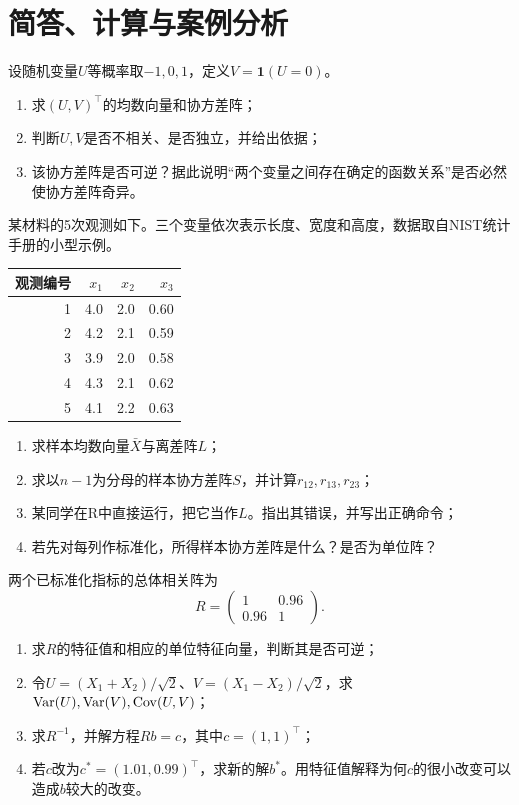 \section{简答、计算与案例分析}

设随机变量$U$等概率取$-1,0,1$，定义$V=\mathbf 1(U=0)$。
\begin{enumerate}[label=（\arabic*）]
\item 求$(U,V)^\top$的均数向量和协方差阵；
\item 判断$U,V$是否不相关、是否独立，并给出依据；
\item 该协方差阵是否可逆？据此说明“两个变量之间存在确定的函数关系”是否必然使协方差阵奇异。
\end{enumerate}

某材料的5次观测如下。三个变量依次表示长度、宽度和高度，数据取自NIST统计手册的小型示例。
\begin{center}\begin{tabular}{rrrr}\toprule
观测编号&$x_1$&$x_2$&$x_3$\\\midrule
1&4.0&2.0&0.60\\2&4.2&2.1&0.59\\3&3.9&2.0&0.58\\4&4.3&2.1&0.62\\5&4.1&2.2&0.63\\\bottomrule
\end{tabular}\end{center}
\begin{enumerate}[label=（\arabic*）]
\item 求样本均数向量$\bar X$与离差阵$L$；
\item 求以$n-1$为分母的样本协方差阵$S$，并计算$r_{12},r_{13},r_{23}$；
\item 某同学在R中直接运行，把它当作$L$。指出其错误，并写出正确命令；
\item 若先对每列作标准化，所得样本协方差阵是什么？是否为单位阵？
\end{enumerate}

两个已标准化指标的总体相关阵为
\[
R=\begin{pmatrix}1&0.96\\0.96&1\end{pmatrix}.
\]
\begin{enumerate}[label=（\arabic*）]
\item 求$R$的特征值和相应的单位特征向量，判断其是否可逆；
\item 令$U=(X_1+X_2)/\sqrt2$、$V=(X_1-X_2)/\sqrt2$，求$\operatorname{Var}(U),\operatorname{Var}(V),\operatorname{Cov}(U,V)$；
\item 求$R^{-1}$，并解方程$Rb=c$，其中$c=(1,1)^\top$；
\item 若$c$改为$c^*=(1.01,0.99)^\top$，求新的解$b^*$。用特征值解释为何$c$的很小改变可以造成$b$较大的改变。
\end{enumerate}

